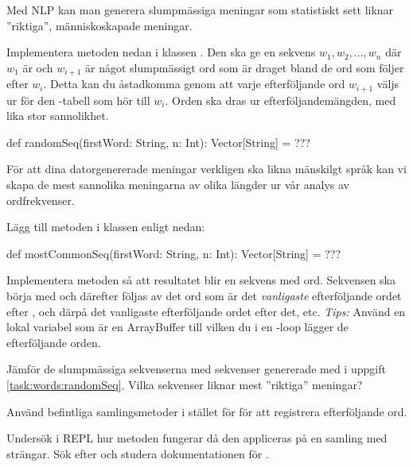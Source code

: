 \Task \label{task:words:randomSeq} Med NLP kan man generera slumpmässiga meningar som statistiskt sett liknar ''riktiga'', människoskapade meningar.

Implementera metoden  nedan i klassen . Den ska ge en sekvens $w_{1}, w_{2}, ..., w_{n}$  där $w_{1}$ är  och $w_{i+1}$ är något slumpmässigt ord som är draget bland de ord som följer efter $w_{i}$. Detta kan du åstadkomma genom att varje efterföljande ord $w_{i+1}$ väljs ur  för den -tabell som hör till $w_{i}$. Orden ska dras ur efterföljandemängden, med lika stor sannolikhet.
\begin{Code}
def randomSeq(firstWord: String, n: Int): Vector[String] = ???
\end{Code}

\Task \label{task:words:mostCommonSeq} För att dina datorgenererade meningar verkligen ska likna mänskilgt språk kan vi skapa de mest sannolika meningarna av olika längder ur vår analys av ordfrekvenser.

Lägg till metoden  i klassen  enligt nedan:
\begin{Code}
def mostCommonSeq(firstWord: String, n: Int): Vector[String] = ???
\end{Code}
\Subtask Implementera metoden så att resultatet blir en sekvens med  ord. Sekvensen ska börja med  och därefter följas av det ord som är det \emph{vanligaste} efterföljande ordet efter , och därpå det vanligaste efterföljande ordet efter det, etc. \emph{Tips:} Använd en lokal variabel  som är en ArrayBuffer till vilken du i en -loop lägger de efterföljande orden.

\Subtask Jämför de slumpmässiga sekvenserna med sekvenser genererade med  i uppgift \ref{task:words:randomSeq}. Vilka sekvenser liknar mest ''riktiga'' meningar?


\Task Använd befintliga samlingsmetoder i stället för  för att registrera efterföljande ord.

\Subtask Undersök i REPL hur metoden  fungerar då den appliceras på en samling med strängar. Sök efter och studera dokumentationen för .

